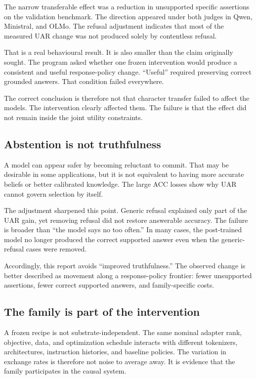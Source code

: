 \documentclass[9pt,letterpaper,twocolumn]{extarticle}
\begin{document}
The narrow transferable effect was a reduction in unsupported specific
assertions on the validation benchmark. The direction appeared under
both judges in Qwen, Ministral, and OLMo. The refusal adjustment
indicates that most of the measured UAR change was not produced solely
by contentless refusal.

That is a real behavioural result. It is also smaller than the claim
originally sought. The program asked whether one frozen intervention
would produce a consistent and useful response-policy change. ``Useful''
required preserving correct grounded answers. That condition failed
everywhere.

The correct conclusion is therefore not that character transfer failed
to affect the models. The intervention clearly affected them. The
failure is that the effect did not remain inside the joint utility
constraints.

\subsection{Abstention is not
truthfulness}\label{abstention-is-not-truthfulness}

A model can appear safer by becoming reluctant to commit. That may be
desirable in some applications, but it is not equivalent to having more
accurate beliefs or better calibrated knowledge. The large ACC losses
show why UAR cannot govern selection by itself.

The adjustment sharpened this point. Generic refusal explained only part
of the UAR gain, yet removing refusal did not restore answerable
accuracy. The failure is broader than ``the model says no too often.''
In many cases, the post-trained model no longer produced the correct
supported answer even when the generic-refusal cases were removed.

Accordingly, this report avoids ``improved truthfulness.'' The observed
change is better described as movement along a response-policy frontier:
fewer unsupported assertions, fewer correct supported answers, and
family-specific costs.

\subsection{The family is part of the
intervention}\label{the-family-is-part-of-the-intervention}

A frozen recipe is not substrate-independent. The same nominal adapter
rank, objective, data, and optimization schedule interacts with
different tokenizers, architectures, instruction histories, and baseline
policies. The variation in exchange rates is therefore not noise to
average away. It is evidence that the family participates in the causal
system.
\end{document}
